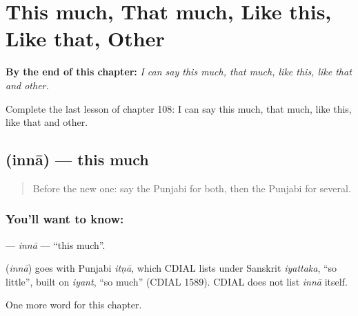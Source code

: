 
\chapter{This much, That much, Like this, Like that, Other}
\label{ch:pa-this-much-that-much-like-this-like-that-other}

\begin{chapteropening}
\textbf{By the end of this chapter:} \emph{I can say this much, that much, like this, like that and other.}

Complete the last lesson of chapter 108: I can say this much, that much, like this, like that and other.
\end{chapteropening}

\section[\texorpdfstring{\pa{ਇੰਨਾ} (innā)}{ਇੰਨਾ (innā)}]{ (innā) — this much}

\label{lesson:PA-C108-inna}



\begin{quote}
Before the new one: say the Punjabi for both, then the Punjabi for several.
\end{quote}

\subsection*{You'll want to know: }
\textbf{} — \emph{innā} — \textquotedblleft{}this much\textquotedblright{}.

\begin{cousinweb}
\textbf{} (\emph{innā}) goes with Punjabi \emph{itṇā}, which CDIAL lists under Sanskrit \emph{iyattaka}, \textquotedblleft{}so little\textquotedblright{}, built on \emph{iyant}, \textquotedblleft{}so much\textquotedblright{} (CDIAL 1589). CDIAL does not list \emph{innā} itself.
\end{cousinweb}

\begin{grammarlens}[title={What you've built}]
One more word for this chapter.
\end{grammarlens}

